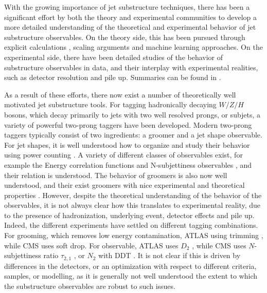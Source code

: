 \documentclass[11pt,letterpaper]{article}
\begin{document}
 
 With the growing importance of jet substructure techniques, there has been a significant effort by both the theory and experimental communities to develop a more detailed understanding of the theoretical and experimental behavior of jet substructure observables. On the theory side, this has been pursued through explicit calculations \cite{Feige:2012vc,Field:2012rw,Dasgupta:2013ihk,Dasgupta:2013via,Larkoski:2014pca,Dasgupta:2015yua,Seymour:1997kj,Li:2011hy,Larkoski:2012eh,Jankowiak:2012na,Chien:2014nsa,Chien:2014zna,Isaacson:2015fra,Krohn:2012fg,Waalewijn:2012sv,Larkoski:2014tva,Procura:2014cba,Bertolini:2015pka,Bhattacherjee:2015psa,Larkoski:2015kga,Dasgupta:2015lxh,Frye:2016okc,Frye:2016aiz,Kang:2016ehg,Hornig:2016ahz,Marzani:2017mva}, scaling arguments \cite{Walsh:2011fz,Larkoski:2014gra,Larkoski:2014zma} and machine learning \cite{Cogan:2014oua,deOliveira:2015xxd,Almeida:2015jua,Baldi:2016fql,Guest:2016iqz,Conway:2016caq,Barnard:2016qma} approaches. On the experimental side, there have been detailed studies of the behavior of substructure observables in data, and their interplay with experimental realities, such as detector resolution and pile up. Summaries can be found in \cite{Abdesselam:2010pt,Altheimer:2012mn,Altheimer:2013yza,Adams:2015hiv}.

As a result of these efforts, there now exist a number of theoretically well motivated jet substructure tools. For tagging hadronically decaying $W/Z/H$ bosons, which decay primarily to jets with two well resolved prongs, or subjets, a variety of powerful two-prong taggers have been developed.  Modern two-prong taggers typically consist of two ingredients: a groomer and a jet shape observable.
For jet shapes, it is well understood how to organize and study their behavior using power counting \cite{Larkoski:2014gra}. A variety of different classes of observables exist, for example the Energy correlation functions \cite{Larkoski:2013eya} and N-subjettiness observables \cite{Thaler:2010tr,Thaler:2011gf}, and their relation is understood. The behavior of groomers is also now well understood, and their exist groomers with nice experimental and theoretical properties \cite{Dasgupta:2013ihk,Larkoski:2014wba}. However, despite the theoretical understanding of the behavior of the observables, it is not always clear how this translates to experimental reality, due to the presence of hadronization, underlying event, detector effects and pile up. Indeed, the different experiments have settled on different tagging combinations. For grooming, which removes low energy contamination,  ATLAS using trimming \cite{Krohn:2009th}, while CMS uses soft drop\cite{Larkoski:2014wba}. For observable, ATLAS uses $D_2$ \cite{Larkoski:2014gra,Larkoski:2015kga}, while CMS uses $N$-subjettiness ratio $\tau_{2,1}$ \cite{Thaler:2010tr,Thaler:2011gf}, or $N_2$ \cite{Moult:2016cvt} with DDT \cite{Dolen:2016kst}. It is not clear if this is driven by differences in the detectors, or an optimization with respect to different criteria, samples, or modelling, as it is generally not well understood the extent to which the substructure observables are robust to such issues.
\end{document}
